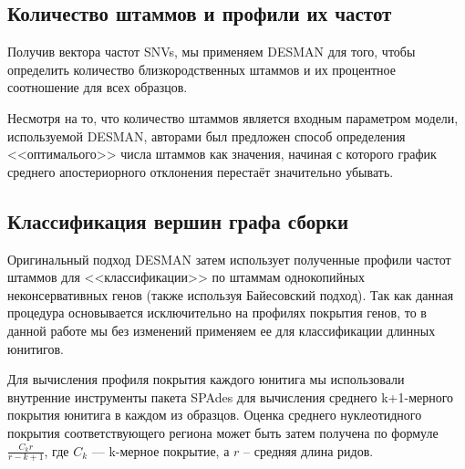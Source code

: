 \documentclass{spbau-diploma}
\begin{document}
\subsection{Количество штаммов и профили их частот}

Получив вектора частот SNVs, мы применяем DESMAN для того, чтобы определить количество близкородственных штаммов и их процентное соотношение для всех образцов. 

Несмотря на то, что количество штаммов является входным параметром модели, используемой DESMAN, авторами был предложен способ определения <<оптималього>> числа штаммов как значения, начиная с которого график среднего апостериорного отклонения перестаёт значительно убывать. 



\subsection{Классификация вершин графа сборки}

Оригинальный подход DESMAN затем использует полученные профили частот штаммов для <<классификации>> по штаммам однокопийных неконсервативных генов (также используя Байесовский подход). Так как данная процедура основывается исключительно на профилях покрытия генов, то в данной работе мы без изменений применяем ее для классификации длинных юнитигов. 


Для вычисления профиля покрытия каждого юнитига мы использовали внутренние инструменты пакета SPAdes для вычисления среднего k+1-мерного покрытия юнитига в каждом из образцов. Оценка среднего нуклеотидного покрытия соответствующего региона может быть затем получена по формуле $\frac{C_k r}{r - k + 1}$, где $C_k$ --- k-мерное покрытие, а $r$ -- средняя длина ридов.
\end{document}
